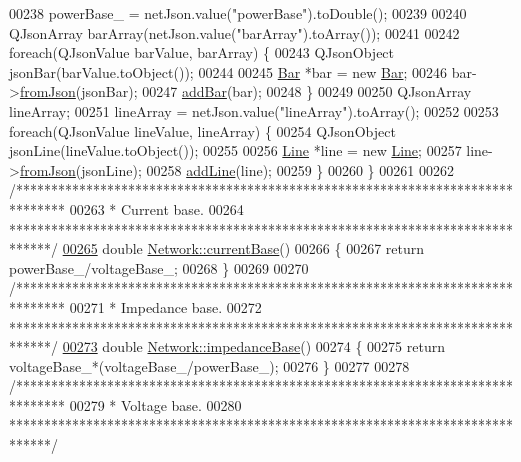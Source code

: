 \begin{DoxyCode}
00238   powerBase\_ = netJson.value(\textcolor{stringliteral}{"powerBase"}).toDouble();
00239 
00240   QJsonArray barArray(netJson.value(\textcolor{stringliteral}{"barArray"}).toArray());
00241 
00242   \textcolor{keywordflow}{foreach}(QJsonValue barValue, barArray) \{
00243     QJsonObject jsonBar(barValue.toObject());
00244 
00245     \hyperlink{class_bar}{Bar} *bar = \textcolor{keyword}{new} \hyperlink{class_bar}{Bar};
00246     bar->\hyperlink{group___models_ga1df62f03dd3a066ceaf6588ba6bb6004}{fromJson}(jsonBar);
00247     \hyperlink{group___models_ga8c5dfef0216731246f7411e1a5fbee01}{addBar}(bar);
00248   \}
00249 
00250   QJsonArray lineArray;
00251   lineArray = netJson.value(\textcolor{stringliteral}{"lineArray"}).toArray();
00252 
00253   \textcolor{keywordflow}{foreach}(QJsonValue lineValue, lineArray) \{
00254     QJsonObject jsonLine(lineValue.toObject());
00255 
00256     \hyperlink{class_line}{Line} *line = \textcolor{keyword}{new} \hyperlink{class_line}{Line};
00257     line->\hyperlink{group___models_ga62623ad71df5279377cc69da90decc75}{fromJson}(jsonLine);
00258     \hyperlink{group___models_gae02945131494987b3ff9b59b627719b4}{addLine}(line);
00259   \}
00260 \}
00261 
00262 \textcolor{comment}{/*******************************************************************************}
00263 \textcolor{comment}{ * Current base.}
00264 \textcolor{comment}{ ******************************************************************************/}
\hypertarget{network_8cpp_source_l00265}{}\hyperlink{group___models_ga433bc5c32cf2ce5329bb40b21952d885}{00265} \textcolor{keywordtype}{double} \hyperlink{group___models_ga433bc5c32cf2ce5329bb40b21952d885}{Network::currentBase}()
00266 \{
00267   \textcolor{keywordflow}{return} powerBase\_/voltageBase\_;
00268 \}
00269 
00270 \textcolor{comment}{/*******************************************************************************}
00271 \textcolor{comment}{ * Impedance base.}
00272 \textcolor{comment}{ ******************************************************************************/}
\hypertarget{network_8cpp_source_l00273}{}\hyperlink{group___models_gae6794c93d37df113778c37c2c702f6d9}{00273} \textcolor{keywordtype}{double} \hyperlink{group___models_gae6794c93d37df113778c37c2c702f6d9}{Network::impedanceBase}()
00274 \{
00275   \textcolor{keywordflow}{return} voltageBase\_*(voltageBase\_/powerBase\_);
00276 \}
00277 
00278 \textcolor{comment}{/*******************************************************************************}
00279 \textcolor{comment}{ * Voltage base.}
00280 \textcolor{comment}{ ******************************************************************************/}

\end{DoxyCode}
